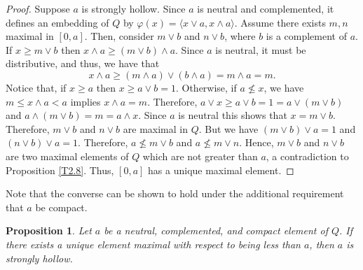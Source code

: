 \documentclass[11pt,english]{amsart}
\newtheorem{proposition}[theorem]{Proposition}
\theoremstyle{definition}
\numberwithin{equation}{section}
\theoremstyle{remark}
\begin{document}
	\begin{proof}
		Suppose $a$ is strongly hollow. Since $a$ is neutral and complemented, it defines an embedding of $Q$ by $\varphi(x)=\langle x\vee a,x\wedge a\rangle$. Assume there exists $m,n$ maximal in $[0,a]$. Then, consider $m\vee b$ and $n\vee b$, where $b$ is a complement of $a$. If $x\geqslant m\vee b$ then $x\wedge a \geqslant (m\vee b)\wedge a$. Since $a$ is neutral, it must be distributive, and thus, we have that \[x\wedge a\geqslant (m\wedge a)\vee(b\wedge a)=m\wedge a=m.\] Notice that, if $x\geqslant a$ then $x\geqslant a\vee b=1$. Otherwise, if $a\nleq x$, we have $m\leqslant x\wedge a<a$ implies $x \wedge a= m $. Therefore, \(a\vee x\geqslant  a\vee  b=1=a\vee (m\vee b)\) and $a\wedge(m\vee b)=m=a\wedge x$. Since $a$ is neutral this shows that $x=m\vee b$. Therefore, $m\vee b$ and $n\vee b$ are maximal in $Q$. But we have  $(m\vee b)\vee a = 1$ and $(n\vee b)\vee a=1$. Therefore, $a\nleq m\vee b$ and $a\nleq m\vee n$. Hence, $m\vee b$ and $n\vee b$ are two maximal elements of $Q$ which are not greater than $a$, a contradiction to Proposition \ref{T2.8}. Thus, $[0,a]$ has a unique maximal element.
	\end{proof}
    
    
	Note that the converse can be shown to hold under the additional requirement that $a$ be compact. 
	\begin{proposition}
		Let $a$ be a neutral, complemented, and compact element of $Q$. If there exists a unique element maximal with respect to being less than $a$, then $a$ is strongly hollow.
	\end{proposition}
	
\end{document}
